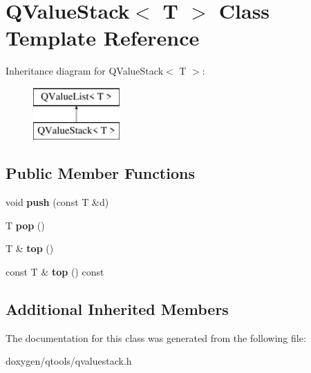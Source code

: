\hypertarget{class_q_value_stack}{}\section{Q\+Value\+Stack$<$ T $>$ Class Template Reference}
\label{class_q_value_stack}
Inheritance diagram for Q\+Value\+Stack$<$ T $>$\+:\begin{figure}[H]
\begin{center}
\leavevmode
\includegraphics[height=2.000000cm]{class_q_value_stack}
\end{center}
\end{figure}
\subsection*{Public Member Functions}
\begin{DoxyCompactItemize}
\item 
\mbox{\label{class_q_value_stack_a2b0e467a293ab39dcc488d4ea21de51f}} 
void {\bfseries push} (const T \&d)
\item 
\mbox{\label{class_q_value_stack_a17ceddf08b4761a39f5b85e4035a2fbb}} 
T {\bfseries pop} ()
\item 
\mbox{\label{class_q_value_stack_a14f13973339e3188b8ef328ce65bb91f}} 
T \& {\bfseries top} ()
\item 
\mbox{\label{class_q_value_stack_aa99d02032de8151b9a1807c92c1e800b}} 
const T \& {\bfseries top} () const
\end{DoxyCompactItemize}
\subsection*{Additional Inherited Members}


The documentation for this class was generated from the following file\+:\begin{DoxyCompactItemize}
\item 
doxygen/qtools/qvaluestack.\+h\end{DoxyCompactItemize}
